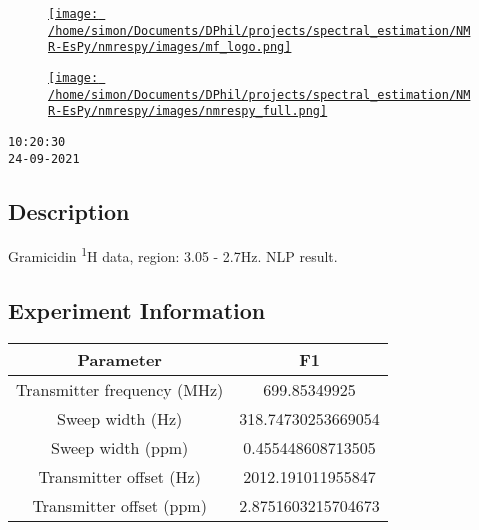 \documentclass[8pt]{article}
\begin{document}
\begin{figure}[!ht]
\begin{minipage}[b][2.5cm][c]{.72\textwidth}
\href{http://foroozandeh.chem.ox.ac.uk/home}%
{\texttt{[image: /home/simon/Documents/DPhil/projects/spectral\_estimation/NMR-EsPy/nmrespy/images/mf\_logo.png]}}
\end{minipage}
\begin{minipage}[b][2.5cm][c]{.27\textwidth}
\href{https://foroozandehgroup.github.io/NMR-EsPy}%
{\texttt{[image: /home/simon/Documents/DPhil/projects/spectral\_estimation/NMR-EsPy/nmrespy/images/nmrespy\_full.png]}}
\end{minipage}
\end{figure}

\texttt{10:20:30\\24-09-2021}

\subsection*{Description}
Gramicidin \textsuperscript{{1}}H data, region: 3.05 - 2.7Hz. NLP result.

\subsection*{Experiment Information}
\hspace{-6pt}
\begin{longtable}[l]{c c}
\toprule
Parameter & F1
\\\midrule
Transmitter frequency (MHz) & 699.85349925\\
Sweep width (Hz) & 318.74730253669054\\
Sweep width (ppm) & 0.455448608713505\\
Transmitter offset (Hz) & 2012.191011955847\\
Transmitter offset (ppm) & 2.8751603215704673\\
\bottomrule
\end{longtable}

\end{document}

